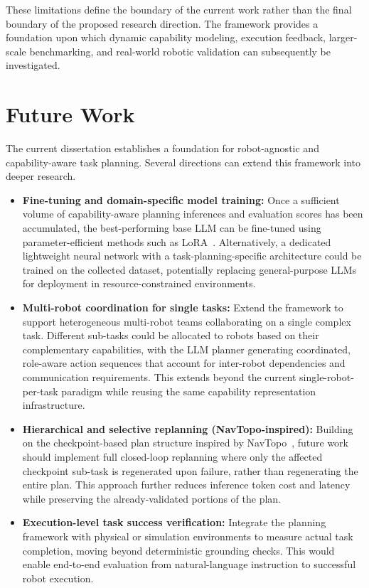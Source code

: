 \documentclass[12pt,a4paper]{article}
\begin{document}
These limitations define the boundary of the current work rather than the final boundary of the proposed research direction.
The framework provides a foundation upon which dynamic capability modeling, execution feedback, larger-scale benchmarking, and real-world robotic validation can subsequently be investigated.

\section{Future Work}

The current dissertation establishes a foundation for robot-agnostic and capability-aware task planning.
Several directions can extend this framework into deeper research.

\begin{itemize}
  \item \textbf{Fine-tuning and domain-specific model training:} Once a sufficient volume of capability-aware planning inferences and evaluation scores has been accumulated, the best-performing base LLM can be fine-tuned using parameter-efficient methods such as LoRA~\cite{peft}. Alternatively, a dedicated lightweight neural network with a task-planning-specific architecture could be trained on the collected dataset, potentially replacing general-purpose LLMs for deployment in resource-constrained environments.
  \item \textbf{Multi-robot coordination for single tasks:} Extend the framework to support heterogeneous multi-robot teams collaborating on a single complex task. Different sub-tasks could be allocated to robots based on their complementary capabilities, with the LLM planner generating coordinated, role-aware action sequences that account for inter-robot dependencies and communication requirements. This extends beyond the current single-robot-per-task paradigm while reusing the same capability representation infrastructure.
  \item \textbf{Hierarchical and selective replanning (NavTopo-inspired):} Building on the checkpoint-based plan structure inspired by NavTopo~\cite{navtopo}, future work should implement full closed-loop replanning where only the affected checkpoint sub-task is regenerated upon failure, rather than regenerating the entire plan. This approach further reduces inference token cost and latency while preserving the already-validated portions of the plan.
  \item \textbf{Execution-level task success verification:} Integrate the planning framework with physical or simulation environments to measure actual task completion, moving beyond deterministic grounding checks. This would enable end-to-end evaluation from natural-language instruction to successful robot execution.

\end{itemize}
\end{document}
